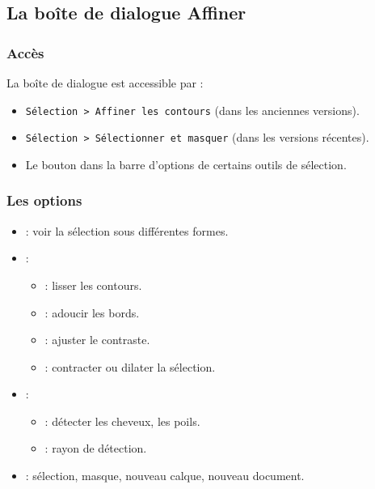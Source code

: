 \subsection{La boîte de dialogue Affiner}

\subsubsection{Accès}

La boîte de dialogue  est accessible par :

\begin{itemize}
    \item \texttt{Sélection > Affiner les contours} (dans les anciennes versions).
    \item \texttt{Sélection > Sélectionner et masquer} (dans les versions récentes).
    \item Le bouton  dans la barre d'options de certains outils de sélection.
\end{itemize}

\subsubsection{Les options}

\begin{itemize}
    \item {} : voir la sélection sous différentes formes.
    \item {} :
    \begin{itemize}
        \item {} : lisser les contours.
        \item {} : adoucir les bords.
        \item {} : ajuster le contraste.
        \item {} : contracter ou dilater la sélection.
    \end{itemize}
    \item {} :
    \begin{itemize}
        \item {} : détecter les cheveux, les poils.
        \item {} : rayon de détection.
    \end{itemize}
    \item {} : sélection, masque, nouveau calque, nouveau document.
\end{itemize}

